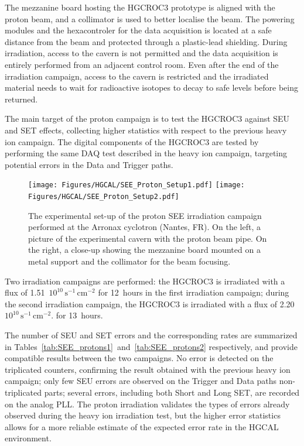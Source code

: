 The mezzanine board hosting the HGCROC3 prototype is aligned with the proton beam, and a collimator is used to better localise the beam. 
The powering modules and the hexacontroler for the data acquisition is located at a safe distance from the beam and protected through a plastic-lead shielding.
During irradiation, access to the cavern is not permitted and the data acquisition is entirely performed from an adjacent control room. Even after the end of the irradiation campaign, access to the cavern is restricted and the irradiated material needs to wait for radioactive isotopes to decay to safe levels before being returned.

\bigbreak

The main target of the proton campaign is to test the HGCROC3 against SEU and SET effects, collecting higher statistics with respect to the previous heavy ion campaign. 
The digital components of the HGCROC3 are tested by performing the same DAQ test described in the heavy ion campaign, targeting potential errors in the Data and Trigger paths.

\begin{figure}
    \centering
    \texttt{[image: Figures/HGCAL/SEE\_Proton\_Setup1.pdf]}
    \texttt{[image: Figures/HGCAL/SEE\_Proton\_Setup2.pdf]}
    \caption{The experimental set-up of the proton SEE irradiation campaign performed at the Arronax cyclotron (Nantes, FR). On the left, a picture of the experimental cavern with the proton beam pipe. On the right, a close-up showing the mezzanine board mounted on a metal support and the collimator for the beam focusing.}
    \label{fig:SEE_Proton_Setup}
\end{figure}

Two irradiation campaigns are performed: the HGCROC3 is irradiated with a flux of 1.51~$10^{10}\,\textrm{s}^{-1}\,\textrm{cm}^{-2}$ for 12~hours in the first irradiation campaign; during the second irradiation campaign, the HGCROC3 is irradiated with a flux of 2.20~$10^{10}\,\textrm{s}^{-1}\,\textrm{cm}^{-2}$. for 13~hours. 

The number of SEU and SET errors and the corresponding rates are summarized in Tables~\ref{tab:SEE_protons1}~and~\ref{tab:SEE_protons2} respectively, and provide compatible results between the two campaigns.
No error is detected on the triplicated counters, confirming the result obtained with the previous heavy ion campaign; only few SEU errors are observed on the Trigger and Data paths non-triplicated parts; several errors, including both Short and Long SET, are recorded on the analog PLL. The proton irradiation validates the types of errors already observed during the heavy ion irradiation test, but the higher error statistics allows for a more reliable estimate of the expected error rate in the HGCAL environment.

